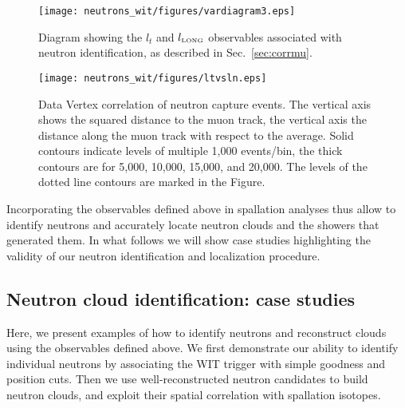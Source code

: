 \begin{figure}
    \centering
    \texttt{[image: neutrons\_wit/figures/vardiagram3.eps]} %
    \caption{Diagram showing the $l_t$ and $l_{\mbox{\tiny LONG}}$ observables associated with neutron identification, as described in Sec.~\ref{sec:corrmu}.}
    \label{fig:vardia}
\end{figure}
\begin{figure}
    \centering
    \texttt{[image: neutrons\_wit/figures/ltvsln.eps]}    %
    \caption{Data Vertex correlation of neutron capture events. The vertical axis shows the squared distance to the muon track, the vertical axis the distance along the muon track with respect to the average. Solid contours indicate levels of multiple 1,000 events/bin, the thick contours are for 5,000, 10,000, 15,000, and 20,000. The levels of the dotted line contours are marked in the Figure.}
    \label{fig:ltvln}
\end{figure}

Incorporating the observables defined above in spallation analyses thus allow to identify neutrons and accurately locate neutron clouds and the showers that generated them. In what follows we will show case studies highlighting the validity of our neutron identification and localization procedure. 

\subsection{Neutron cloud identification: case studies}
\label{sec:hadronic_data}
Here, we present examples of how to identify neutrons and reconstruct clouds using the observables defined above. We first demonstrate our ability to identify individual neutrons by associating the WIT trigger with simple goodness and position cuts. Then we use well-reconstructed neutron candidates to build neutron clouds, and exploit their spatial correlation with spallation isotopes.

